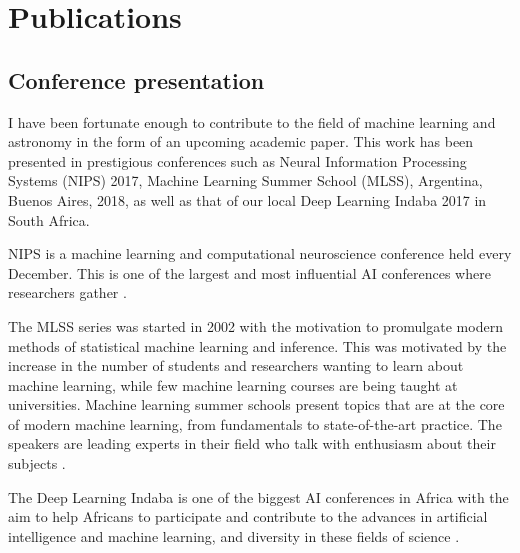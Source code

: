 \chapter*{Publications}

\section*{Conference presentation}

I have been fortunate enough to contribute to the field of machine learning and astronomy in the form of an
upcoming academic paper. This work has been presented in prestigious conferences such as Neural Information Processing Systems (NIPS) 2017, Machine Learning Summer School (MLSS), Argentina, Buenos Aires, 2018, as well as that of our local Deep Learning Indaba 2017 in South Africa.

NIPS is a machine learning and computational neuroscience conference held  every December. This is one of the largest and most influential AI conferences where researchers gather \citep{NIPS}. 

The MLSS series was started in 2002 with the motivation to
promulgate modern methods of statistical machine learning and inference. This was motivated by the increase in the number of students and researchers wanting to learn about machine learning, while few machine learning courses are being taught at universities.
Machine learning summer schools present topics that are at the core of modern machine learning, from fundamentals to state-of-the-art practice. The speakers are leading experts in their field who talk with enthusiasm about their subjects \citep{MLSS}.

The Deep Learning Indaba is one of the biggest AI conferences in Africa with the aim to help Africans to participate and contribute to the advances in artificial intelligence and machine learning, and diversity in these fields of science \citep{DLI}. 
 